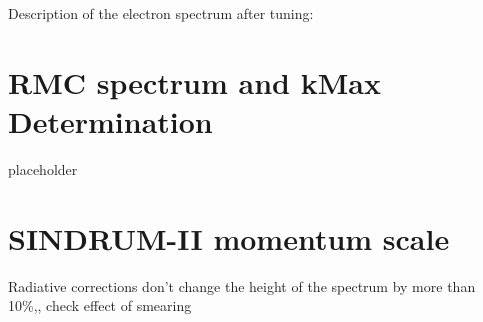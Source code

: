 \documentclass[12pt]{article}
\begin{document}
Description of the electron spectrum after tuning:


\newpage
\section {RMC spectrum and kMax Determination}

placeholder

\newpage
\section {SINDRUM-II momentum scale }

Radiative corrections don't change the height of the spectrum by more than 10\%,,
check effect of smearing 
\end{document}
